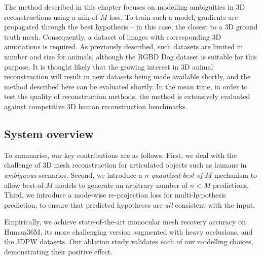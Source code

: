 The method described in this chapter focuses on modelling ambiguities in 3D reconstructions using a min-of-$M$ loss. To train such a model, gradients are propagated through the best hypothesis -- in this case, the closest to a 3D ground truth mesh. Consequently, a dataset of images with corresponding 3D annotations is required. As previously described, such datasets are limited in number and size for animals, although the RGBD Dog dataset is suitable for this purpose. It is thought likely that the growing interest in 3D animal reconstruction will result in new datasets being made available shortly, and the method described here can be evaluated shortly. In the mean time, in order to test the quality of reconstruction methods, the method is extensively evaluated against competitive 3D human reconstruction benchmarks.

\subsection{System overview}
To summarise, our key contributions are as follows.
First, we deal with the challenge of 3D mesh reconstruction for articulated objects such as humans in \emph{ambiguous} scenarios.
Second, we introduce a \emph{$n$-quantized-best-of-$M$} mechanism to allow best-of-$M$ models to generate an arbitrary number of $n<M$ predictions.
Third, we introduce a mode-wise re-projection loss for multi-hypothesis prediction, to ensure that predicted hypotheses are \emph{all} consistent with the input.

Empirically, we achieve state-of-the-art monocular mesh recovery accuracy on Human36M, its more challenging version augmented with heavy occlusions, and the 3DPW datasets.
Our ablation study validates each of our modelling choices, demonstrating their positive effect.

